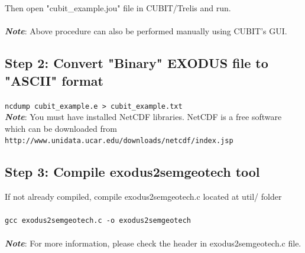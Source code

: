 \colorbox{gray}{
\parbox{16cm}{
}}
\\
\\
Then open "cubit\_example.jou" file in CUBIT/Trelis and run.\\
\\
\textbf{\emph{Note}}: Above procedure can also be performed manually using CUBIT's GUI.

\subsection*{Step 2: Convert "Binary" EXODUS file to "ASCII" format}
\texttt{ncdump cubit\_example.e > cubit\_example.txt}\\

\textbf{\emph{Note}}: You must have installed NetCDF libraries. NetCDF is a free software which can be downloaded from
\texttt{http://www.unidata.ucar.edu/downloads/netcdf/index.jsp}

\subsection*{Step 3: Compile exodus2semgeotech tool}
If not already compiled, compile exodus2semgeotech.c located at util/ folder\\
\\
\texttt{gcc exodus2semgeotech.c -o exodus2semgeotech}
\\
\\
\textbf{\emph{Note}}: For more information, please check the header in exodus2semgeotech.c file.


